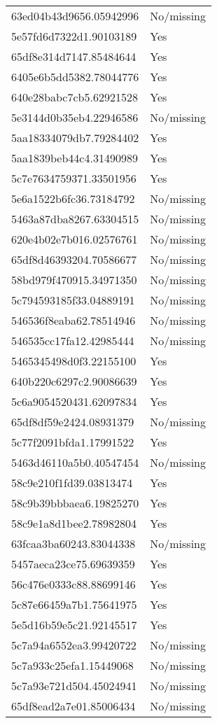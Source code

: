 \begin{tabular}{ll}
63ed04b43d9656.05942996 & No/missing \\
5e57fd6d7322d1.90103189 & Yes \\
65df8e314d7147.85484644 & Yes \\
6405e6b5dd5382.78044776 & Yes \\
640e28babc7cb5.62921528 & Yes \\
5e3144d0b35eb4.22946586 & No/missing \\
5aa18334079db7.79284402 & Yes \\
5aa1839beb44c4.31490989 & Yes \\
5c7e7634759371.33501956 & Yes \\
5e6a1522b6fc36.73184792 & No/missing \\
5463a87dba8267.63304515 & No/missing \\
620e4b02e7b016.02576761 & No/missing \\
65df8d46393204.70586677 & No/missing \\
58bd979f470915.34971350 & No/missing \\
5c794593185f33.04889191 & No/missing \\
546536f8eaba62.78514946 & No/missing \\
546535cc17fa12.42985444 & No/missing \\
5465345498d0f3.22155100 & Yes \\
640b220c6297c2.90086639 & Yes \\
5c6a9054520431.62097834 & Yes \\
65df8df59e2424.08931379 & No/missing \\
5c77f2091bfda1.17991522 & Yes \\
5463d46110a5b0.40547454 & No/missing \\
58c9e210f1fd39.03813474 & Yes \\
58c9b39bbbaea6.19825270 & Yes \\
58c9e1a8d1bee2.78982804 & Yes \\
63fcaa3ba60243.83044338 & No/missing \\
5457aeca23ce75.69639359 & Yes \\
56c476e0333c88.88699146 & Yes \\
5c87e66459a7b1.75641975 & Yes \\
5e5d16b59e5c21.92145517 & Yes \\
5c7a94a6552ea3.99420722 & No/missing \\
5c7a933c25efa1.15449068 & No/missing \\
5c7a93e721d504.45024941 & No/missing \\
65df8ead2a7e01.85006434 & No/missing \\

\end{tabular}
